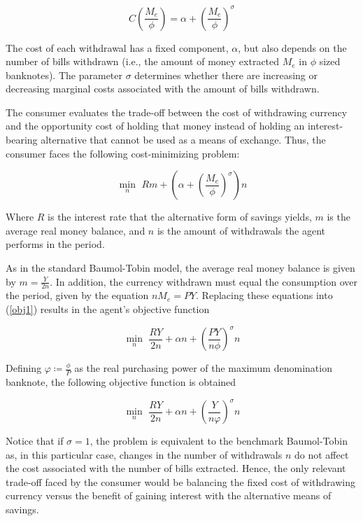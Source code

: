 \documentclass[12pt]{article}
\begin{document}
\begin{equation}
    C\left(\frac{M_e}{\phi}\right) = \alpha + \left(\frac{M_e}{\phi}\right)^\sigma
    \label{obj}
\end{equation}

The cost of each withdrawal has a fixed component, $\alpha$, but also depends on the number of bills withdrawn (i.e., the amount of money extracted $M_e$ in $\phi$ sized banknotes). The parameter $\sigma$ determines whether there are increasing or decreasing marginal costs associated with the amount of bills withdrawn.

The consumer evaluates the trade-off between the cost of withdrawing currency and the opportunity cost of holding that money instead of holding an interest-bearing alternative that cannot be used as a means of exchange. Thus, the consumer faces the following cost-minimizing problem:

\begin{equation}
    \min_n \hspace{4pt} Rm + \left(\alpha + \left(\frac{M_e}{\phi}\right)^\sigma\right) n
    \label{obj1}
\end{equation}

Where $R$ is the interest rate that the alternative form of savings yields, $m$ is the average real money balance, and $n$ is the amount of withdrawals the agent performs in the period. 

As in the standard Baumol-Tobin model, the average real money balance is given by $ m = \frac{Y}{2n} $. In addition, the currency withdrawn must equal the consumption over the period, given by the equation $n M_e = PY $. Replacing these equations into (\ref{obj1}) results in the agent's objective function

\begin{equation}
    \min_n \hspace{4pt} \frac{RY}{2n} + \alpha n + \left(\frac{PY}{n\phi}\right)^\sigma n
\end{equation}

Defining $\varphi \coloneqq \frac{\phi}{P}$ as the real purchasing power of the maximum denomination banknote, the following objective function is obtained

\begin{equation}
    \min_n \hspace{4pt} \frac{RY}{2n} + \alpha n + \left(\frac{Y}{n\varphi}\right)^\sigma n
\end{equation}

Notice that if $\sigma = 1$, the problem is equivalent to the benchmark Baumol-Tobin as, in this particular case, changes in the number of withdrawals $n$ do not affect the cost associated with the number of bills extracted. Hence, the only relevant trade-off faced by the consumer would be balancing the fixed cost of withdrawing currency versus the benefit of gaining interest with the alternative means of savings.
\end{document}
